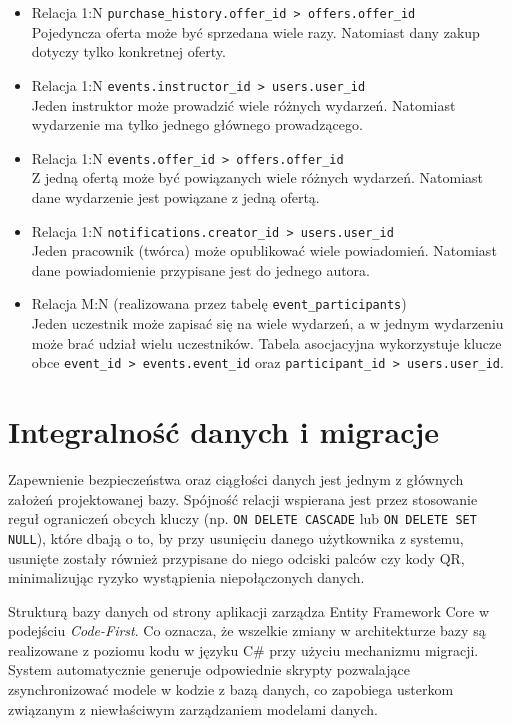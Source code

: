 \begin{itemize}
    \item Relacja 1:N \texttt{purchase\_history.offer\_id > offers.offer\_id} \\
          Pojedyncza oferta może być sprzedana wiele razy. Natomiast dany zakup dotyczy tylko konkretnej oferty.

    \item Relacja 1:N \texttt{events.instructor\_id > users.user\_id} \\
          Jeden instruktor może prowadzić wiele różnych wydarzeń. Natomiast wydarzenie ma tylko jednego głównego prowadzącego.

    \item Relacja 1:N \texttt{events.offer\_id > offers.offer\_id} \\
          Z jedną ofertą może być powiązanych wiele różnych wydarzeń. Natomiast dane wydarzenie jest powiązane z jedną ofertą.

    \item Relacja 1:N \texttt{notifications.creator\_id > users.user\_id} \\
          Jeden pracownik (twórca) może opublikować wiele powiadomień. Natomiast dane powiadomienie przypisane jest do jednego autora.

    \item Relacja M:N (realizowana przez tabelę \texttt{event\_participants}) \\
          Jeden uczestnik może zapisać się na wiele wydarzeń, a w jednym wydarzeniu może brać udział wielu uczestników. Tabela asocjacyjna wykorzystuje klucze obce \texttt{event\_id > events.event\_id} oraz \texttt{participant\_id > users.user\_id}.
\end{itemize}

\section{Integralność danych i migracje}

Zapewnienie bezpieczeństwa oraz ciągłości danych jest jednym z głównych założeń projektowanej bazy. Spójność relacji wspierana jest przez stosowanie reguł ograniczeń obcych kluczy (np. \texttt{ON DELETE CASCADE} lub \texttt{ON DELETE SET NULL}), które dbają o to, by przy usunięciu danego użytkownika z systemu, usunięte zostały również przypisane do niego odciski palców czy kody QR, minimalizując ryzyko wystąpienia niepołączonych danych.

Strukturą bazy danych od strony aplikacji zarządza Entity Framework Core w podejściu \textit{Code-First}. Co oznacza, że wszelkie zmiany w architekturze bazy są realizowane z poziomu kodu w języku C\# przy użyciu mechanizmu migracji. System automatycznie generuje odpowiednie skrypty pozwalające zsynchronizować modele w kodzie z bazą danych, co zapobiega usterkom związanym z niewłaściwym zarządzaniem modelami danych.


